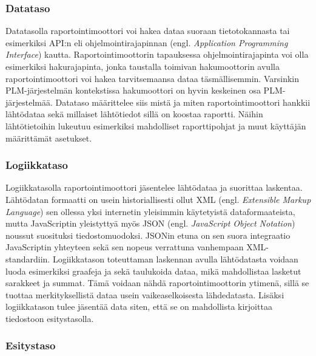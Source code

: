 \subsubsection{Datataso}

Datatasolla raportointimoottori voi hakea dataa suoraan tietotokannasta tai esimerkiksi API:n eli ohjelmointirajapinnan (engl. \textit{Application Programming Interface}) kautta. Raportointimoottorin tapauksessa ohjelmointirajapinta voi olla esimerkiksi hakurajapinta, jonka taustalla toimivan hakumoottorin avulla raportointimoottori voi hakea tarvitsemaansa dataa täsmällisemmin. Varsinkin PLM-järjestelmän kontekstissa hakumoottori on hyvin keskeinen osa PLM-järjestelmää. Datataso määrittelee siis mistä ja miten raportointimoottori hankkii lähtödataa sekä millaiset lähtötiedot sillä on koostaa raportti. \cite{he_design_2010} Näihin lähtötietoihin lukeutuu esimerkiksi mahdolliset raporttipohjat ja muut käyttäjän määrittämät asetukset.

\subsubsection{Logiikkataso}

Logiikkatasolla raportointimoottori jäsentelee lähtödataa ja suorittaa laskentaa. Lähtödatan formaatti on usein historiallisesti ollut XML (engl. \textit{Extensible Markup Language}) sen ollessa yksi internetin yleisimmin käytetyistä dataformaateista, mutta JavaScriptin yleistyttyä myös JSON (engl. \textit{JavaScript Object Notation}) noussut suosituksi tiedostomuodoksi. JSONin etuna on sen suora integraatio JavaScriptin yhteyteen sekä sen nopeus verrattuna vanhempaan XML-standardiin. \cite{nurseitov_comparison_nodate} Logiikkatason toteuttaman laskennan avulla lähtödatasta voidaan luoda esimerkiksi graafeja ja sekä taulukoida dataa, mikä mahdollistaa lasketut sarakkeet ja summat. Tämä voidaan nähdä raportointimoottorin ytimenä, sillä se tuottaa merkityksellistä dataa usein vaikeaselkoisesta lähdedatasta. \cite{he_design_2010} Lisäksi logiikkatason tulee jäsentää data siten, että se on mahdollista kirjoittaa tiedostoon esitystasolla.

\subsubsection{Esitystaso}

